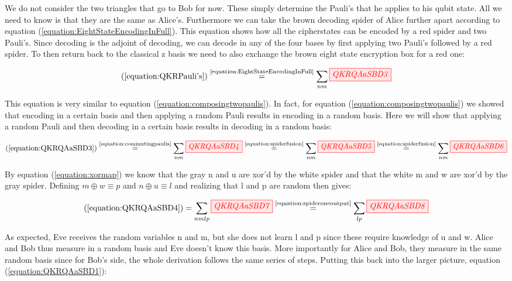 \documentclass[]{article}
\newcommand{\equaltext}[1]{\ensuremath{\stackrel{\text{#1}}{=}}}
\begin{document}
We do not consider the two triangles that go to Bob for now. These simply determine the Pauli's that he applies to his qubit state. All we need to know is that they are the same as Alice's. Furthermore we can take the brown decoding spider of Alice further apart according to equation (\ref{equation:EightStateEncodingInFull}). This equation shows how all the cipherstates can be encoded by a red spider and two Pauli's. Since decoding is the adjoint of decoding, we can decode in any of the four bases by first applying two Pauli's followed by a red spider. To then return back to the classical z basis we need to also exchange the brown eight state encryption box for a red one:

\begin{equation}
	\label{equation:QKRQAaSBD3}
	(\ref{equation:QKRPauli's}) \equaltext{\ref{equation:EightStateEncodingInFull}} \sum\limits_{nm}\tikzfig{QKRQAaSBD3}
\end{equation}

This equation is very similar to equation (\ref{equation:composingtwopaulis}). In fact, for equation (\ref{equation:composingtwopaulis}) we showed that encoding in a certain basis and then applying a random Pauli results in encoding in a random basis. Here we will show that applying a random Pauli and then decoding in a certain basis results in decoding in a random basis:

\begin{equation}
\label{equation:QKRQAaSBD4}
(\ref{equation:QKRQAaSBD3}) \equaltext{\ref{equation:commutingpaulis}} \sum\limits_{nm}\tikzfig{QKRQAaSBD4} \equaltext{\ref{equation:spiderfusion}} \sum\limits_{nm}\tikzfig{QKRQAaSBD5} \equaltext{\ref{equation:spiderfusion}} \sum\limits_{nm}\tikzfig{QKRQAaSBD6} 
\end{equation}

By equation (\ref{equation:xormap}) we know that the gray n and u are xor'd by the white spider and that the white m and w are xor'd by the gray spider. Defining $m \oplus w \equiv p$ and $n \oplus u \equiv l$ and realizing that l and p are random then gives: 

\begin{equation}
	\label{equation:randompaulidecoding}
	(\ref{equation:QKRQAaSBD4}) = 
	\sum\limits_{nmlp}\tikzfig{QKRQAaSBD7} \equaltext{\ref{equation:spideroneoutput}} \sum\limits_{lp}\tikzfig{QKRQAaSBD8}
\end{equation}

As expected, Eve receives the random variables n and m, but she does not learn l and p since these require knowledge of u and w. Alice and Bob thus measure in a random basis and Eve doesn't know this basis. More importantly for Alice and Bob, they measure in the same random basis since for Bob's side, the whole derivation follows the same series of steps. Putting this back into the larger picture, equation (\ref{equation:QKRQAaSBD1}):
\end{document}
